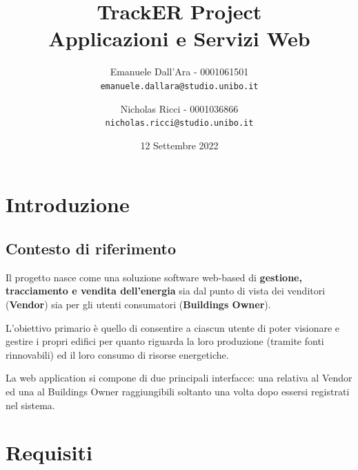 \documentclass{report}
\title{
    TrackER Project \\
    \large Applicazioni e Servizi Web
}
\author{
  Emanuele Dall'Ara - 0001061501\\
  \texttt{emanuele.dallara@studio.unibo.it}
  \and
  Nicholas Ricci - 0001036866\\
  \texttt{nicholas.ricci@studio.unibo.it}}
\date{12 Settembre 2022}
\begin{document}
\maketitle
\tableofcontents
\maketitle
\chapter{Introduzione}
\section{Contesto di riferimento}

Il progetto nasce come una soluzione software web-based di \textbf{gestione, tracciamento e vendita dell’energia} sia dal punto di vista dei venditori (\textbf{Vendor}) sia per gli utenti consumatori (\textbf{Buildings Owner}). 

L’obiettivo primario è quello di consentire a ciascun utente di poter visionare e gestire i propri edifici per quanto riguarda la loro produzione (tramite fonti rinnovabili) ed il loro consumo di risorse energetiche.
\par La web application si compone di due principali interfacce: una relativa al Vendor ed una al Buildings Owner raggiungibili soltanto una volta dopo essersi registrati nel sistema.


 
\chapter{Requisiti}
\end{document}
